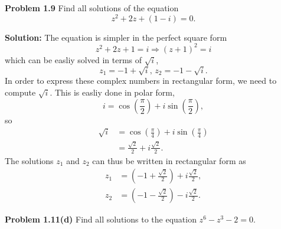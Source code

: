 \documentclass[12pt,oneside]{exam}
\newenvironment{exercise}[1]{\vspace{.1in}\noindent\textbf{Problem #1 \hspace{.05em}}}{}
\begin{document}
\vspace{1cm}

\begin{exercise}{1.9}
Find all solutions of the equation
\begin{equation*}
z^2+2z+(1-i) = 0.
\end{equation*}
\end{exercise}

\noindent \textbf{Solution:} The equation is simpler in the perfect square form
\begin{equation*}
z^2+2z+1 = i \Rightarrow (z+1)^2 = i
\end{equation*}
which can be easliy solved in terms of $\sqrt{i}$, 
\begin{equation*}
z_1 = -1+\sqrt{i}, \, z_2 = -1-\sqrt{i}.
\end{equation*}
In order to express these complex numbers in rectangular form, we need to compute $\sqrt{i}$. This is easliy done in polar form, 
\begin{equation*}
i = \cos\left(\frac{\pi}{2}\right) + i\sin \left(\frac{\pi}{2}\right),
\end{equation*}
so 
\begin{align*}
\sqrt{i} & = \cos\left( \frac{\pi}{4} \right) + i\sin \left( \frac{\pi}{4} \right) \\
& = \frac{\sqrt{2}}{2} + i \frac{\sqrt{2}}{2}.
\end{align*}
The solutions $z_1$ and $z_2$ can thus be written in rectangular form as
\begin{align*}
z_1 & = \left(-1+\frac{\sqrt{2}}{2}\right) + i \frac{\sqrt{2}}{2},\\
z_2 & = \left(-1-\frac{\sqrt{2}}{2}\right) - i\frac{\sqrt{2}}{2}.
\end{align*}

\vspace{1cm}

\begin{exercise}{1.11(d)}
Find all solutions to the equation $z^6-z^3-2=0$. 
\end{exercise}
\end{document}

